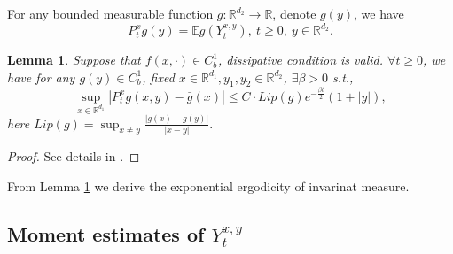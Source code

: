 \documentclass[11pt,reqno]{amsart}
\newtheorem{lemma}{\indent Lemma}[section]
\numberwithin{equation}{section}
\begin{document}
For any bounded measurable function $g:\mathbb{R}^{d_{2}}\rightarrow \mathbb{R}$, denote $ g(y)$, we have
$$ P_{t}^{x}g(y)=\mathbb{E}g(Y_{t}^{ x,y}),\ t\geq 0,\ y\in \mathbb{R}^{d_{2}}.$$
\begin{lemma}\label{L42}
	Suppose that $ f(x,\cdot)\in C^{1}_{b}$, dissipative condition  is valid. $\forall  t\geq0$,  we have for any $g(y)\in C^{1}_{b}$, fixed $x\in \mathbb{R}^{d_{1}},  y_{1}, y_{2}\in \mathbb{R}^{d_{2}}$, $\exists \beta>0$ s.t., 
	$$ \sup_{x\in \mathbb{R}^{d_{1}}}| P_{t}^{x}g(x,y)-\bar{g}(x)|\leq C\cdot Lip(g)e^{-\frac{\beta t}{2}}(1+|y|),$$
	here $ Lip(g)=\sup_{x\neq y}\frac{|g(x)-g(y)|}{|x-y|}.$
\end{lemma}
\begin{proof}
	See details in \cite[Proposition 3.8]{SXX}.
\end{proof}

From Lemma \ref{L42} we derive the exponential ergodicity of invarinat measure.



\subsection{Moment estimates of $ Y_{t}^{ x,y}$}
\end{document}
